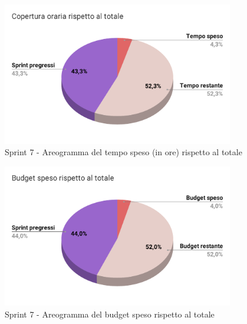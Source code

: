   \begin{figure}[H]
    \centering
    \includegraphics[width=0.90\textwidth]{assets/Consuntivo/Sprint-7/copertura_oraria.pdf}
    \caption{Sprint 7 - Areogramma del tempo speso (in ore) rispetto al totale}
  \end{figure}

  \begin{figure}[H]
    \centering
    \includegraphics[width=0.90\textwidth]{assets/Consuntivo/Sprint-7/budget_speso.pdf}
    \caption{Sprint 7 - Areogramma del budget speso rispetto al totale}
  \end{figure}

